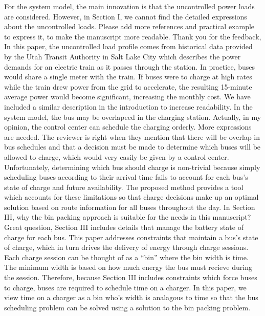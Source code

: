 \documentclass{article}
\begin{document}
\begin{buttkissing}
	\reviewerclaims For the system model, the main innovation is that the uncontrolled power loads are considered. However, in Section I, we cannot find the detailed expressions about the uncontrolled loads. Please add more references and practical example to express it, to make the manuscript more readable.
	\kissbutt Thank you for the feedback, In this paper, the uncontrolled load profile comes from historical data provided by the Utah Transit Authority in Salt Lake City which describes the power demands for an electric train as it passes through the station. In practice, buses would share a single meter with the train. If buses were to charge at high rates while the train drew power from the grid to accelerate, the resulting 15-minute average power would become significant, increasing the monthly cost. We have included a similar description in the introduction to increase readability.
	\reviewerclaims In the system model, the bus may be overlapeed in the charging station. Actually, in my opinion, the control center can schedule the charging orderly. More expressions are needed.
	\kissbutt The reviewer is right when they mention that there will be overlap in bus schedules and that a decision must be made to determine which buses will be allowed to charge, which would very easily be given by a control center. Unfortunately, determining which bus should charge is non-trivial because simply scheduling buses according to their arrival time fails to account for each bus's state of charge and future availability.  The proposed method provides a tool which accounts for these limitations so that charge decisions make up an optimal solution based on route information for all buses throughout the day. 
	\reviewerclaims In Section III, why the bin packing approach is suitable for the needs in this manuscript?
	\kissbutt Great question, Section III includes details that manage the battery state of charge for each bus. This paper addresses constraints that maintain a bus's state of charge, which in turn drives the delivery of energy through charge sessions. Each charge session can be thought of as a ``bin'' where the bin width is time. The minimum width is based on how much energy the bus must recieve during the session. Therefore, because Section III includes constraints which force buses to charge, buses are required to schedule time on a charger. In this paper, we view time on a charger as a bin who's width is analagous to time so that the bus scheduling problem can be solved using a solution to the bin packing problem. 

\end{buttkissing}
\end{document}
